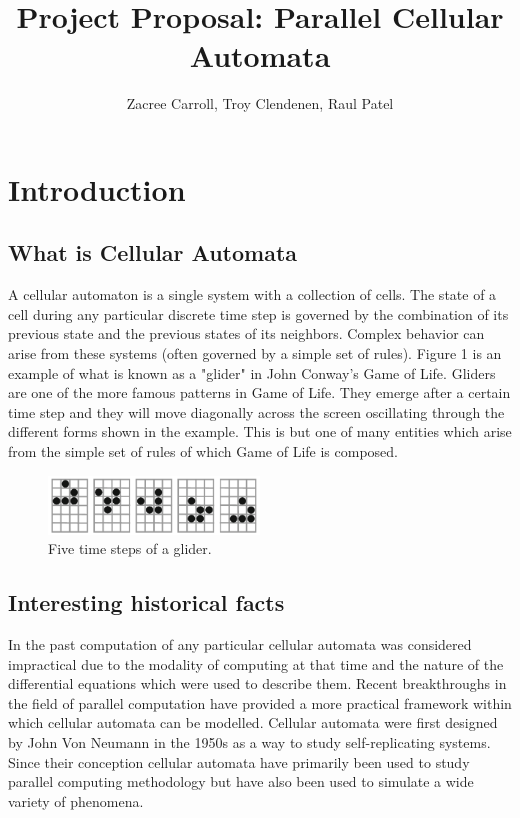 \documentclass[12pt]{article}
\title{Project Proposal: Parallel Cellular Automata}
\author{Zacree Carroll, Troy Clendenen, Raul Patel}
\begin{document}
\maketitle


\section{Introduction}
\subsection{What is Cellular Automata}
A cellular automaton is a single system with a collection of cells. The state of a cell during any particular discrete time step is governed by the combination of its previous state and the previous states of its neighbors. Complex behavior can arise from these systems (often governed by a simple set of rules). Figure 1 is an example of what is known as a "glider" in John Conway's Game of Life. Gliders are one of the more famous patterns in Game of Life. They emerge after a certain time step and they will move diagonally across the screen oscillating through the different forms shown in the example. This is but one of many entities which arise from the simple set of rules of which Game of Life is composed. 

\begin{figure}[h]
\centering
\includegraphics[width=0.5\textwidth]{5-stepGlider.PNG}
\caption{\label{fig:Glider}Five time steps of a glider.}
\end{figure}

\par 
\subsection{Interesting historical facts}
In the past computation of any particular cellular automata was considered impractical due to the modality of computing at that time and the nature of the differential equations which were used to describe them.\cite{Cann95} Recent breakthroughs in the field of parallel computation have provided a more practical framework within which cellular automata can be modelled. Cellular automata were first designed by John Von Neumann in the 1950s as a way to study self-replicating systems.\cite{neumann} Since their conception cellular automata have primarily been used to study parallel computing methodology but have also been used to simulate a wide variety of phenomena.\cite{Cann95} 
\end{document}
